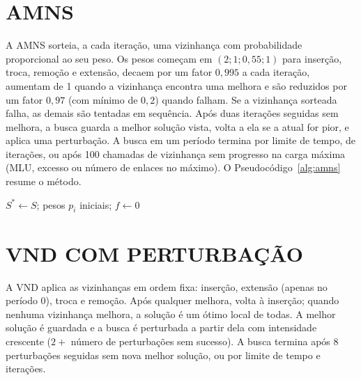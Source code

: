 \section{\uppercase{AMNS}}

A AMNS sorteia, a cada iteração, uma vizinhança com probabilidade proporcional ao seu peso. Os pesos começam em $(2; 1; 0{,}55; 1)$ para inserção, troca, remoção e extensão, decaem por um fator $0{,}995$ a cada iteração, aumentam de 1 quando a vizinhança encontra uma melhora e são reduzidos por um fator $0{,}97$ (com mínimo de $0{,}2$) quando falham. Se a vizinhança sorteada falha, as demais são tentadas em sequência. Após duas iterações seguidas sem melhora, a busca guarda a melhor solução vista, volta a ela se a atual for pior, e aplica uma perturbação. A busca em um período termina por limite de tempo, de iterações, ou após 100 chamadas de vizinhança sem progresso na carga máxima (MLU, excesso ou número de enlaces no máximo). O Pseudocódigo~\ref{alg:amns} resume o método.

\begin{algorithm}[H]
\caption{AMNS em um período.}
\label{alg:amns}
$S^* \leftarrow S$; pesos $p_i$ iniciais; $f \leftarrow 0$\;
\end{algorithm}

\section{\uppercase{VND com Perturbação}}

A VND aplica as vizinhanças em ordem fixa: inserção, extensão (apenas no período 0), troca e remoção. Após qualquer melhora, volta à inserção; quando nenhuma vizinhança melhora, a solução é um ótimo local de todas. A melhor solução é guardada e a busca é perturbada a partir dela com intensidade crescente ($2 + $ número de perturbações sem sucesso). A busca termina após 8 perturbações seguidas sem nova melhor solução, ou por limite de tempo e iterações.


